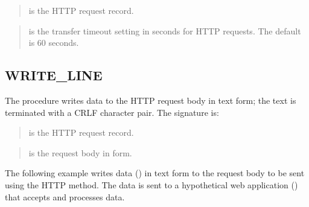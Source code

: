 \documentclass[letterpaper,10pt,english,openany,oneside]{sphinxmanual}
\begin{document}

\begin{quote}

 is the HTTP request record.
\end{quote}

\begin{quote}

 is the transfer timeout setting in seconds for HTTP
requests. The default is 60 seconds.
\end{quote}


\subsection{WRITE\_LINE}
\label{\detokenize{utl_http:write-line}}
The  procedure writes data to the HTTP request body in text
form; the text is terminated with a CRLF character pair. The signature
is:
\begin{quote}

\end{quote}


\begin{quote}

 is the HTTP request record.
\end{quote}

\begin{quote}

 is the request body in  form.
\end{quote}


The following example writes data () in text form
to the request body to be sent using the HTTP  method. The data is
sent to a hypothetical web application () that accepts and
processes data.
\end{document}
